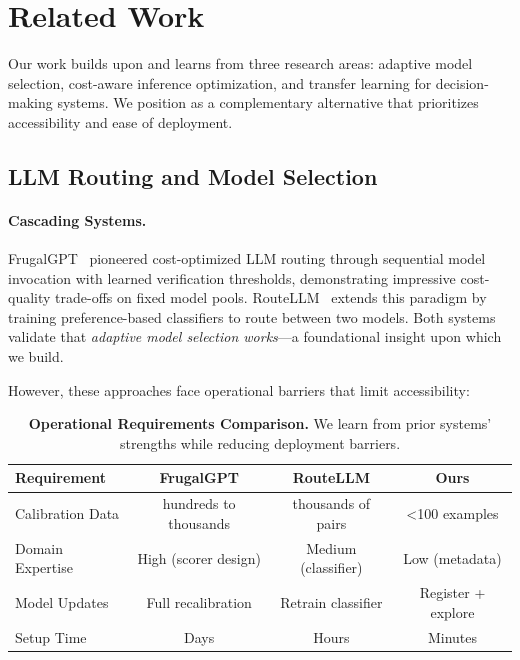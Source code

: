 
\section{Related Work}
\label{sec:related}

Our work builds upon and learns from three research areas: adaptive model selection, cost-aware inference optimization, and transfer learning for decision-making systems. We position \ours{} as a complementary alternative that prioritizes accessibility and ease of deployment.

\subsection{LLM Routing and Model Selection}

\paragraph{Cascading Systems.} FrugalGPT~\cite{chen2023frugalgpt} pioneered cost-optimized LLM routing through sequential model invocation with learned verification thresholds, demonstrating impressive cost-quality trade-offs on fixed model pools. RouteLLM~\cite{ong2024routellm} extends this paradigm by training preference-based classifiers to route between two models. Both systems validate that \emph{adaptive model selection works}---a foundational insight upon which we build.

However, these approaches face operational barriers that limit accessibility:

\begin{table}[t]
\centering
\footnotesize
\caption{\textbf{Operational Requirements Comparison.} We learn from prior systems' strengths while reducing deployment barriers.}
\label{tab:operational_comparison}
\begin{tabular}{lccc}
\toprule
\textbf{Requirement} & \textbf{FrugalGPT} & \textbf{RouteLLM} & \textbf{Ours} \\
\midrule
Calibration Data & hundreds to thousands & thousands of pairs & <100 examples \\
Domain Expertise & High (scorer design) & Medium (classifier) & Low (metadata) \\
Model Updates & Full recalibration & Retrain classifier & Register + explore \\
Setup Time & Days & Hours & Minutes \\
\bottomrule
\end{tabular}
\end{table}

